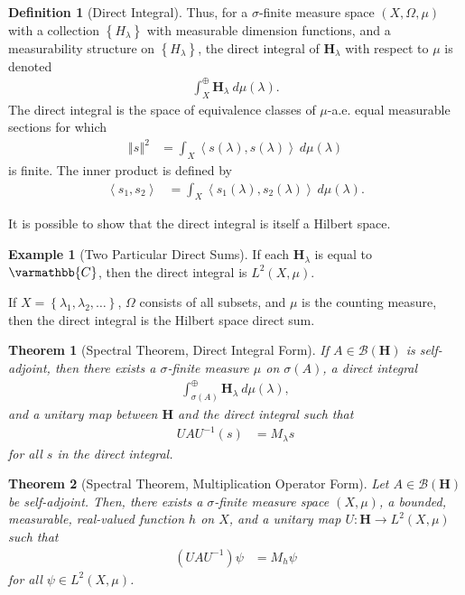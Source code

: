 \documentclass[12pt]{extarticle}
\newcommand{\C}{\varmathbb{C}}
\newcommand{\set}[1]{\left\{#1\right\}}
\newcommand{\iprod}[2]{\left\langle #1,#2\right\rangle}
\newcommand{\norm}[1]{\left\Vert #1\right\Vert}
\theoremstyle{plain}
\newtheorem*{theorem}{Theorem}%
\theoremstyle{definition}
\newtheorem*{definition}{Definition}
\newtheorem*{example}{Example}
\theoremstyle{remark}
\renewcommand{\newline}{\hfill\break}
\begin{document}
\begin{definition}[Direct Integral]
    Thus, for a $\sigma$-finite measure space $(X,\Omega,\mu)$ with a collection $\set{H_{\lambda}}$ with measurable dimension functions, and a measurability structure on $\set{H_{\lambda}}$, the direct integral of $\mathbf{H}_{\lambda}$ with respect to $\mu$ is denoted
    \begin{align*}
      \int_{X}^{\oplus} \mathbf{H}_{\lambda}\:d\mu(\lambda).
    \end{align*}
    The direct integral is the space of equivalence classes of $\mu$-a.e. equal measurable sections for which
    \begin{align*}
      \norm{s}^2 &= \int_{X}^{} \iprod{s(\lambda)}{s(\lambda)}\:d\mu(\lambda)
    \end{align*}
    is finite. The inner product is defined by
    \begin{align*}
      \iprod{s_1}{s_2} &= \int_{X}^{} \iprod{s_1(\lambda)}{s_2(\lambda)}\:d\mu(\lambda).
    \end{align*}
  \end{definition}
  It is possible to show that the direct integral is itself a Hilbert space.
  \begin{example}[Two Particular Direct Sums]
    If each $\mathbf{H}_{\lambda}$ is equal to $\C$, then the direct integral is $L^{2}\left(X,\mu\right)$.\newline

    If $X = \set{\lambda_1,\lambda_2,\dots}$, $\Omega$ consists of all subsets, and $\mu$ is the counting measure, then the direct integral is the Hilbert space direct sum.
  \end{example}
  \begin{theorem}[Spectral Theorem, Direct Integral Form]
    If $A \in \mathcal{B}\left(\mathbf{H}\right)$ is self-adjoint, then there exists a $\sigma$-finite measure $\mu$ on $\sigma(A)$, a direct integral
    \begin{align*}
      \int_{\sigma(A)}^{\oplus} \mathbf{H}_{\lambda}\:d\mu(\lambda),
    \end{align*}
    and a unitary map between $\mathbf{H}$ and the direct integral such that
    \begin{align*}
      UAU^{-1}(s) &= M_{\lambda}s
    \end{align*}
    for all $s$ in the direct integral.
  \end{theorem}
  \begin{theorem}[Spectral Theorem, Multiplication Operator Form]
    Let $A\in \mathcal{B}\left(\mathbf{H}\right)$ be self-adjoint. Then, there exists a $\sigma$-finite measure space $(X,\mu)$, a bounded, measurable, real-valued function $h$ on $X$, and a unitary map $U: \mathbf{H}\rightarrow L^{2}(X,\mu)$ such that
    \begin{align*}
      \left(UAU^{-1}\right)\psi &= M_{h}\psi
    \end{align*}
    for all $\psi \in L^{2}\left(X,\mu\right)$.
  \end{theorem}
\end{document}
